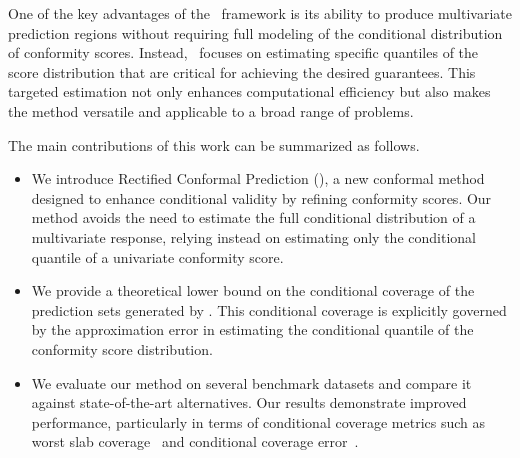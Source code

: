   One of the key advantages of the \RCP\ framework is its ability to produce multivariate prediction regions without requiring full modeling of the conditional distribution of conformity scores. Instead, \RCP\ focuses on estimating specific quantiles of the score distribution that are critical for achieving the desired guarantees. This targeted estimation not only enhances computational efficiency but also makes the method versatile and applicable to a broad range of problems.

  The main contributions of this work can be summarized as follows.
  \begin{itemize}
    \item We introduce Rectified Conformal Prediction (\RCP), a new conformal method designed to enhance conditional validity by refining conformity scores. Our method avoids the need to estimate the full conditional distribution of a multivariate response, relying instead on estimating only the conditional quantile of a univariate conformity score. 

    \item We provide a theoretical lower bound on the conditional coverage of the prediction sets generated by \RCP. This conditional coverage is explicitly governed by the approximation error in estimating the conditional quantile of the conformity score distribution. 
    
    \item We evaluate our method on several benchmark datasets and compare it against state-of-the-art alternatives. Our results demonstrate improved performance, particularly in terms of conditional coverage metrics such as worst slab coverage~\citep{romano2020classification} and conditional coverage error~\citep{dheur2024distribution}.
  \end{itemize}
